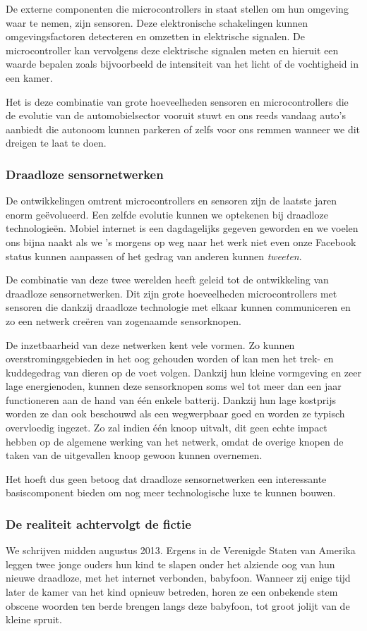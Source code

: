 \documentclass[DIV=calc,paper=a4,fontsize=11pt,twocolumn]{scrartcl}
\newcommand{\heading}[1]{
\subsubsection*{#1}
\vspace{-2mm}
}
\begin{document}
De externe componenten die microcontrollers in staat stellen om hun omgeving
waar te nemen, zijn sensoren. Deze elektronische schakelingen kunnen
omgevingsfactoren detecteren en omzetten in elektrische signalen. De
microcontroller kan vervolgens deze elektrische signalen meten en hieruit een
waarde bepalen zoals bijvoorbeeld de intensiteit van het licht of de vochtigheid
in een kamer.

Het is deze combinatie van grote hoeveelheden sensoren en microcontrollers die
de evolutie van de automobielsector vooruit stuwt en ons reeds vandaag auto's
aanbiedt die autonoom kunnen parkeren of zelfs voor ons remmen wanneer we dit
dreigen te laat te doen.

\heading{Draadloze sensornetwerken}

De ontwikkelingen omtrent microcontrollers en sensoren zijn de laatste jaren
enorm ge\"evolueerd. Een zelfde evolutie kunnen we optekenen bij draadloze
technologie\"en. Mobiel internet is een dagdagelijks gegeven geworden en we
voelen ons bijna naakt als we 's morgens op weg naar het werk niet even onze
Facebook status kunnen aanpassen of het gedrag van anderen kunnen
\emph{tweeten}.

De combinatie van deze twee werelden heeft geleid tot de ontwikkeling van
draadloze sensornetwerken. Dit zijn grote hoeveelheden microcontrollers met
sensoren die dankzij draadloze technologie met elkaar kunnen communiceren en zo
een netwerk cre\"eren van zogenaamde sensorknopen.

De inzetbaarheid van deze netwerken kent vele vormen. Zo kunnen
overstromingsgebieden in het oog gehouden worden of kan men het trek- en
kuddegedrag van dieren op de voet volgen. Dankzij hun kleine vormgeving en zeer
lage energienoden, kunnen deze sensorknopen soms wel tot meer dan een jaar
functioneren aan de hand van \'e\'en enkele batterij. Dankzij hun lage
kostprijs worden ze dan ook beschouwd als een wegwerpbaar goed en worden ze
typisch overvloedig ingezet. Zo zal indien \'e\'en knoop uitvalt, dit geen
echte impact hebben op de algemene werking van het netwerk, omdat de overige
knopen de taken van de uitgevallen knoop gewoon kunnen overnemen.

Het hoeft dus geen betoog dat draadloze sensornetwerken een interessante
basiscomponent bieden om nog meer technologische luxe te kunnen bouwen.

\heading{De realiteit achtervolgt de fictie}

We schrijven midden augustus 2013. Ergens in de Verenigde Staten van Amerika
leggen twee jonge ouders hun kind te slapen onder het alziende oog van hun
nieuwe draadloze, met het internet verbonden, babyfoon. Wanneer zij enige tijd
later de kamer van het kind opnieuw betreden, horen ze een onbekende stem
obscene woorden ten berde brengen langs deze babyfoon, tot groot jolijt van de
kleine spruit.
\end{document}
